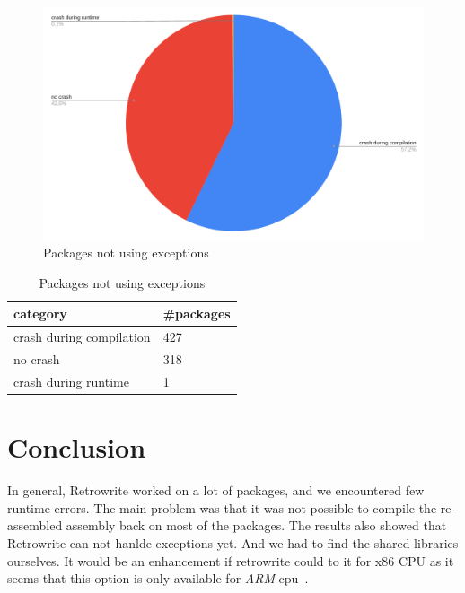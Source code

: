 \documentclass[a4paper,11pt,oneside]{report}
\newcommand{\sysname}{Retrowrite\xspace}
\begin{document}
\newpage
\begin{figure}[h]
    \centering
    \includegraphics[width=15cm]{no_exception.png} 
    \caption{Packages not using exceptions}
    \label{fig:no_exception}
\end{figure}

\begin{table}[h]
    \centering
    \begin{tabular}{ll} 
        \hline
        category                & \#packages  \\ 
        \hline
        crash during compilation & 427         \\
        no crash                 & 318         \\
        crash during runtime     & 1           \\
        \hline
    \end{tabular}
    \caption{Packages not using exceptions}
\end{table}


%



\chapter{Conclusion}

In general, \sysname worked on a lot of packages, and we encountered few runtime
errors. The main problem was that it was not possible to compile the
re-assembled assembly back on most of the packages. The results also showed
that \sysname can not hanlde exceptions yet. And we had to find the
shared-libraries ourselves. It would be an enhancement if retrowrite could to
it for x86 CPU as it seems that this option is only available for \textit{ARM}
cpu~\cite{retroArm}.
\end{document}
